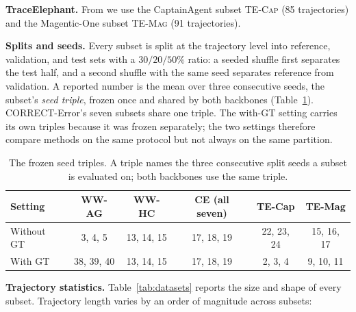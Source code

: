 \textbf{TraceElephant.}
From \citet{traceelephant} we use the CaptainAgent subset \textsc{TE-Cap} (85
trajectories) and the Magentic-One subset \textsc{TE-Mag} (91 trajectories).

\textbf{Splits and seeds.} 
Every subset is split at the trajectory level into reference, validation, and test
sets with a $30/20/50\%$ ratio: a seeded shuffle first separates the test half, and a
second shuffle with the same seed separates reference from validation. A reported
number is the mean over three consecutive seeds, the subset's \emph{seed triple},
frozen once and shared by both backbones (Table~\ref{tab:seeds}). CORRECT-Error's
seven subsets share one triple. The with-GT setting carries its own triples because
it was frozen separately; the two settings therefore compare methods on the same
protocol but not always on the same partition.

\begin{table}[h]
\centering
\small
\caption{The frozen seed triples. A triple names the three consecutive split seeds a
subset is evaluated on; both backbones use the same triple.}
\label{tab:seeds}
\begin{tabular}{l ccccc}
\toprule
Setting & WW-AG & WW-HC & CE (all seven) & TE-Cap & TE-Mag \\
\midrule
Without GT & 3, 4, 5 & 13, 14, 15 & 17, 18, 19 & 22, 23, 24 & 15, 16, 17 \\
With GT    & 38, 39, 40 & 13, 14, 15 & 17, 18, 19 & 2, 3, 4 & 9, 10, 11 \\
\bottomrule
\end{tabular}
\end{table}

\textbf{Trajectory statistics.}
Table~\ref{tab:datasets} reports the size and shape of every subset. Trajectory
length varies by an order of magnitude across subsets: 

